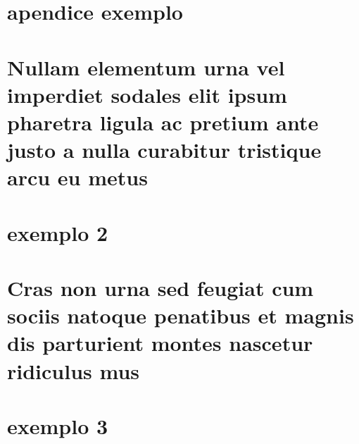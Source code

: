 \documentclass[
	12pt,				%
	openright,			%
	twoside,			%
	a4paper,			%
	english,			%
	french,				%
	spanish,			%
	brazil				%
	]{abntex2}
\begin{document}
%
%


\begin{apendicesenv}

\partapendices

\chapter{apendice exemplo}

\lipsum[50]

\chapter{Nullam elementum urna vel imperdiet sodales elit ipsum pharetra ligula
ac pretium ante justo a nulla curabitur tristique arcu eu metus}
\lipsum[55-57]

\end{apendicesenv}



\begin{anexosenv}

\partanexos

\chapter{exemplo 2}
\lipsum[30]

\chapter{Cras non urna sed feugiat cum sociis natoque penatibus et magnis dis
parturient montes nascetur ridiculus mus}

\lipsum[31]

\chapter{exemplo 3}

\lipsum[32]

\end{anexosenv}

\printindex
\end{document}
